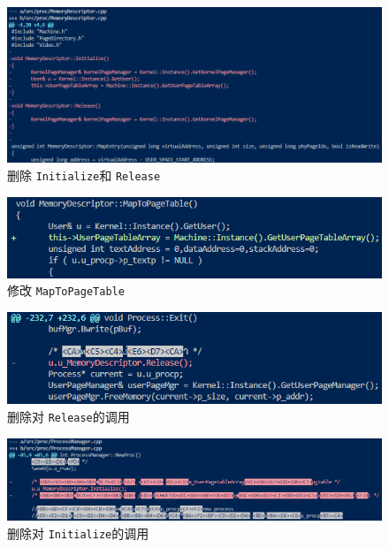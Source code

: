 \begin{figure}[!htbp]
    \centering
    \includegraphics[width=\textwidth]{images/deleteInitRel.png}
    \caption{删除 \texttt{Initialize}和 \texttt{Release}}\label{deleteInitRel}
\end{figure}

\begin{figure}[!htbp]
    \centering
    \includegraphics[scale=1]{images/changeMapToPageTable.png}
    \caption{修改 \texttt{MapToPageTable}}\label{changeMapToPageTable}
\end{figure}

\begin{figure}[!htbp]
    \centering
    \includegraphics[scale=1]{images/deleteRelease.png}
    \caption{删除对 \texttt{Release}的调用}\label{deleteRelease}
\end{figure}

\begin{figure}[!htbp]
    \centering
    \includegraphics[width=\textwidth]{images/deleteInitialize.png}
    \caption{删除对 \texttt{Initialize}的调用}\label{deleteInitialize}
\end{figure}

